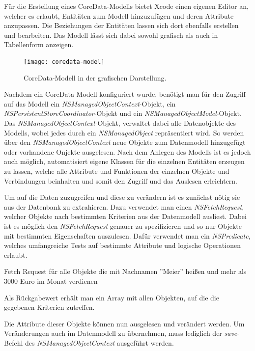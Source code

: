 Für die Erstellung eines CoreData-Modells bietet Xcode einen eigenen Editor an, welcher es erlaubt, Entitäten zum Modell hinzuzufügen und deren Attribute anzupassen. Die Beziehungen der Entitäten lassen sich dort ebenfalls erstellen und bearbeiten. Das Modell lässt sich dabei sowohl grafisch als auch in Tabellenform anzeigen.

\begin{figure}[htb!]
		\centering
	\texttt{[image: coredata-model]}
	\caption{CoreData-Modell in der grafischen Darstellung.}
	\label{coredata-model}
\end{figure}


Nachdem ein CoreData-Modell konfiguriert wurde, benötigt man für den Zugriff auf das Modell ein \emph{NSManagedObjectContext}-Objekt, ein \emph{NSPersistentStoreCoordinator}-Objekt und ein \emph{NSManagedObjectModel}-Objekt. Das \emph{NSManagedObjectContext}-Objekt, verwaltet dabei alle Datenobjekte des Modells, wobei jedes durch ein \emph{NSManagedObject} repräsentiert wird. So werden über den \emph{NSManagedObjectContext} neue Objekte zum Datenmodell hinzugefügt oder vorhandene Onjekte ausgelesen.
Nach dem Anlegen des Modells ist es jedoch auch möglich, automatisiert eigene Klassen für die einzelnen Entitäten erzeugen zu lassen, welche alle Attribute und Funktionen der einzelnen Objekte und Verbindungen beinhalten und somit den Zugriff und das Auslesen erleichtern.

Um auf die Daten zuzugreifen und diese zu verändern ist es zunächst nötig sie aus der Datenbank zu extrahieren. Dazu verwendet man einen \emph{NSFetchRequest}, welcher Objekte nach bestimmten Kriterien aus der Datenmodell ausliest.
Dabei ist es möglich den \emph{NSFetchRequest} genauer zu spezifizieren und so nur Objekte mit bestimmten Eigenschaften auszulesen.
Dafür verwendet man ein \emph{NSPredicate}, welches umfangreiche Tests auf bestimmte Attribute und logische Operationen erlaubt.

\begin{listing}[htb! breaklines=true]
    \caption{Fetch Request für alle Objekte die mit Nachnamen ''Meier'' heißen und mehr als 3000 Euro im Monat verdienen}
	\label{lst:NSFetchRequest_objc}
\end{listing}

Als Rückgabewert erhält man ein Array mit allen Objekten, auf die die gegebenen Kriterien zutreffen.

Die Attribute dieser Objekte können nun ausgelesen und verändert werden. Um Veränderungen auch im Datenmodell zu übernehmen, muss lediglich der \emph{save}-Befehl des \emph{NSManagedObjectContext} ausgeführt werden.

